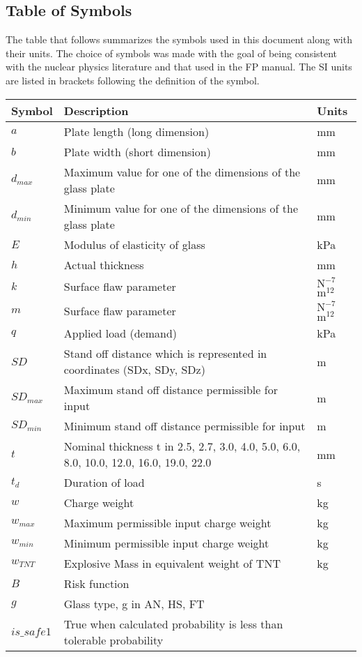 \documentclass[12pt]{article}
\begin{document}
\subsection{Table of Symbols}
\label{Sec:ToS}
The table that follows summarizes the symbols used in this document along with their units.  The choice of symbols was made with the goal of being consistent with the nuclear physics literature and that used in the FP manual.  The SI units are listed in brackets following the definition of the symbol.
\begin{longtable*}{l l l}
\toprule
Symbol & Description & Units
\\
\midrule
$a$ & Plate length (long dimension) & mm
\\
$b$ & Plate width (short dimension) & mm
\\
$d_{max}$ & Maximum value for one of the dimensions of the glass plate & mm
\\
$d_{min}$ & Minimum value for one of the dimensions of the glass plate & mm
\\
$E$ & Modulus of elasticity of glass & kPa
\\
$h$ & Actual thickness & mm
\\
$k$ & Surface flaw parameter & $\text{N}^{-7}$$\text{m}^{12}$
\\
$m$ & Surface flaw parameter & $\text{N}^{-7}$$\text{m}^{12}$
\\
$q$ & Applied load (demand) & kPa
\\
$SD$ & Stand off distance which is represented in coordinates (SDx, SDy, SDz) & m
\\
$SD_{max}$ & Maximum stand off distance permissible for input & m
\\
$SD_{min}$ & Minimum stand off distance permissible for input & m
\\
$t$ & Nominal thickness t in {2.5, 2.7, 3.0, 4.0, 5.0, 6.0, 8.0, 10.0, 12.0, 16.0, 19.0, 22.0} & mm
\\
$t_{d}$ & Duration of load & s
\\
$w$ & Charge weight & kg
\\
$w_{max}$ & Maximum permissible input charge weight & kg
\\
$w_{min}$ & Minimum permissible input charge weight & kg
\\
$w_{TNT}$ & Explosive Mass in equivalent weight of TNT & kg
\\
$B$ & Risk function & 
\\
$g$ & Glass type, g in {AN, HS, FT} & 
\\
$is\_safe1$ & True when calculated probability is less than tolerable probability & 

\end{longtable*}
\end{document}
